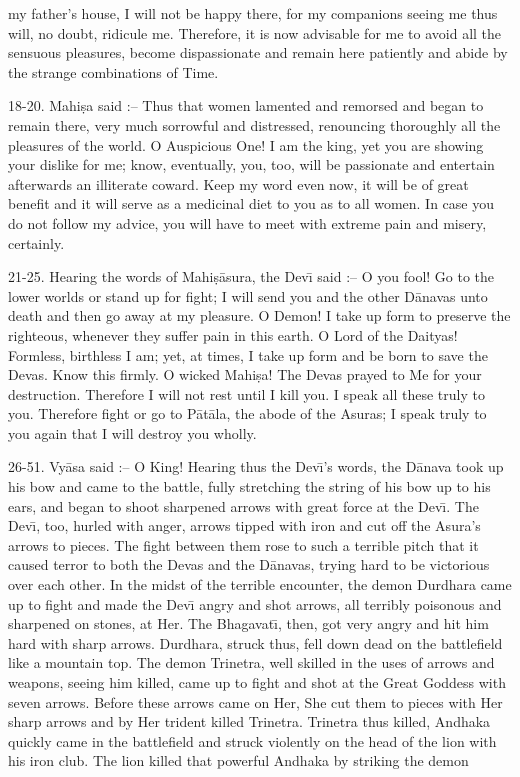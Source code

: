 my father's house, I will not be happy there, for my companions seeing me thus will, no doubt, ridicule me. Therefore, it is now advisable for me to avoid all the sensuous pleasures, become dispassionate and remain here patiently and abide by the strange combinations of Time.

18-20. Mahi\d{s}a said :-- Thus that women lamented and remorsed and began to remain there, very much sorrowful and distressed, renouncing thoroughly all the pleasures of the world. O Auspicious One! I am the king, yet you are showing your dislike for me; know, eventually, you, too, will be passionate and entertain afterwards an illiterate coward. Keep my word even now, it will be of great benefit and it will serve as a medicinal diet to you as to all women. In case you do not follow my advice, you will have to meet with extreme pain and misery, certainly.

21-25. Hearing the words of Mahi\d{s}\=asura, the Dev\={\i} said :-- O you fool! Go to the lower worlds or stand up for fight; I will send you and the other D\=anavas unto death and then go away at my pleasure. O Demon! I take up form to preserve the righteous, whenever they suffer pain in this earth. O Lord of the Daityas! Formless, birthless I am; yet, at times, I take up form and be born to save the Devas. Know this firmly. O wicked Mahi\d{s}a! The Devas prayed to Me for your destruction. Therefore I will not rest until I kill you. I speak all these truly to you. Therefore fight or go to P\=at\=ala, the abode of the Asuras; I speak truly to you again that I will destroy you wholly.

26-51. Vy\=asa said :-- O King! Hearing thus the Dev\={\i}'s words, the D\=anava took up his bow and came to the battle, fully stretching the string of his bow up to his ears, and began to shoot sharpened arrows with great force at the Dev\={\i}. The Dev\={\i}, too, hurled with anger, arrows tipped with iron and cut off the Asura's arrows to pieces. The fight between them rose to such a terrible pitch that it caused terror to both the Devas and the D\=anavas, trying hard to be victorious over each other. In the midst of the terrible encounter, the demon Durdhara came up to fight and made the Dev\={\i} angry and shot arrows, all terribly poisonous and sharpened on stones, at Her. The Bhagavat\={\i}, then, got very angry and hit him hard with sharp arrows. Durdhara, struck thus, fell down dead on the battlefield like a mountain top. The demon Trinetra, well skilled in the uses of arrows and weapons, seeing him killed, came up to fight and shot at the Great Goddess with seven arrows. Before these arrows came on Her, She cut them to pieces with Her sharp arrows and by Her trident killed Trinetra. Trinetra thus killed, Andhaka quickly came in the battlefield and struck violently on the head of the lion with his iron club. The lion killed that powerful Andhaka by striking the demon

